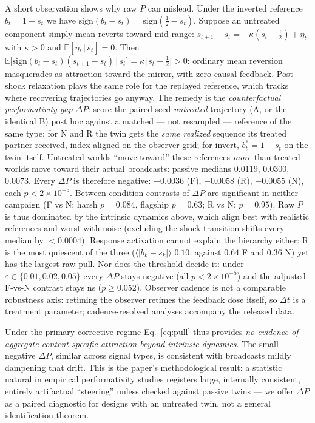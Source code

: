 \documentclass{svproc}
\begin{document}
A short observation shows why raw $P$ can mislead. Under the inverted
reference $b_t=1-s_t$ we have
$\mathrm{sign}(b_t-s_t)=\mathrm{sign}(\tfrac12-s_t)$. Suppose an untreated
component simply mean-reverts toward mid-range:
$s_{t+1}-s_t=-\kappa(s_t-\tfrac12)+\eta_t$ with $\kappa>0$ and
$\mathbb{E}[\eta_t\,|\,s_t]=0$. Then
$\mathbb{E}[\mathrm{sign}(b_t-s_t)(s_{t+1}-s_t)\,|\,s_t]
=\kappa\,|s_t-\tfrac12|>0$: ordinary mean reversion masquerades as
attraction toward the mirror, with zero causal feedback. Post-shock
relaxation plays the same role for the replayed reference, which tracks where
recovering trajectories go anyway. The remedy is the \emph{counterfactual
performativity gap} $\Delta P$: score the paired-seed \emph{untreated}
trajectory (A, or the identical B) post hoc against a matched --- not
resampled --- reference of the same type: for N and R the twin gets the
\emph{same realized} sequence its treated partner received, index-aligned on
the observer grid; for invert, $b^\ast_t=1-s_t$ on the twin itself.
Untreated worlds ``move toward'' these references \emph{more} than
treated worlds move toward their actual broadcasts: passive medians $0.0119$,
$0.0300$, $0.0073$. Every $\Delta P$ is therefore negative: $-0.0036$ (F), $-0.0058$ (R),
$-0.0055$ (N), each $p\!<\!2\times10^{-5}$. Between-condition contrasts of
$\Delta P$ are significant in neither campaign (F vs N: harsh $p=0.084$,
flagship $p=0.63$; R vs N: $p=0.95$). Raw $P$ is thus dominated by the
intrinsic dynamics above, which align best with realistic references and worst
with noise (excluding the shock transition shifts every median by
$<\!0.0004$).
Response activation cannot explain the hierarchy either: R is the most
quiescent of the three ($\langle|b_k-s_k|\rangle$ $0.10$, against $0.64$ F
and $0.36$ N) yet has the largest raw pull. Nor does the threshold decide it:
under $\varepsilon\in\{0.01,0.02,0.05\}$ every $\Delta P$ stays negative (all
$p<2\times10^{-5}$) and the adjusted F-vs-N contrast stays ns ($p\geq0.052$).
Observer cadence is not a comparable robustness axis: retiming the observer
retimes the feedback dose itself, so $\Delta t$ is a treatment parameter;
cadence-resolved analyses accompany the released data.

Under the primary corrective regime Eq.~\ref{eq:pull} thus provides \emph{no
evidence of aggregate content-specific attraction beyond intrinsic dynamics}.
The small negative $\Delta P$, similar across signal types, is consistent with
broadcasts mildly dampening that drift. This is the paper's methodological
result: a statistic natural in empirical performativity studies registers
large, internally consistent, entirely artifactual ``steering'' unless checked
against passive twins --- we offer $\Delta P$ as a paired diagnostic for
designs with an untreated twin, not a general identification theorem.
\end{document}

